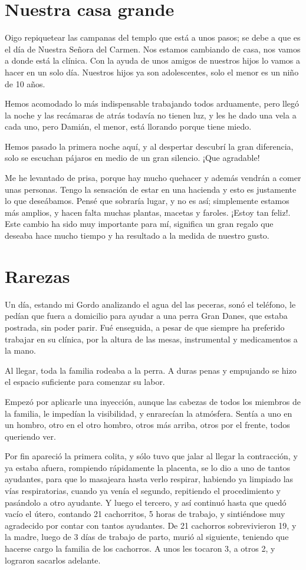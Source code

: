 \documentclass[letterpaper, 12pt]{book}
\begin{document}
\chapter{Nuestra casa grande}
Oigo repiquetear las campanas del templo que está a unos pasos; se debe a que es el día de Nuestra Señora del Carmen. Nos estamos cambiando de casa, nos vamos a donde está la clínica. Con la ayuda de unos amigos de nuestros hijos lo vamos a hacer en un solo día. Nuestros hijos ya son adolescentes, solo el menor es un niño de 10 años. 

Hemos acomodado lo más indispensable trabajando todos arduamente, pero llegó la noche y las recámaras de atrás todavía no tienen luz, y les he dado una vela a cada uno, pero Damián, el menor, está llorando porque tiene miedo.

Hemos pasado la primera noche aquí, y al despertar descubrí la gran diferencia, solo se escuchan pájaros en medio de un gran silencio. ¡Que agradable!

Me he levantado de prisa, porque hay mucho quehacer y además vendrán a comer unas personas. Tengo la sensación de estar en una hacienda y esto es justamente lo que deseábamos. Pensé que sobraría lugar, y no es así; simplemente estamos más amplios, y hacen falta muchas plantas, macetas y faroles. ¡Estoy tan feliz!. Este cambio ha sido muy importante para mí, significa un gran regalo que deseaba hace mucho tiempo y ha resultado a la medida de nuestro gusto.

\chapter{Rarezas}
Un día, estando mi Gordo analizando el agua del las peceras, sonó el teléfono, le pedían que fuera a domicilio para ayudar a una perra Gran Danes, que estaba postrada, sin poder parir. Fué enseguida, a pesar de que siempre ha preferido trabajar en su clínica, por la altura de las mesas, instrumental y medicamentos a la mano.

Al llegar, toda la familia rodeaba a la perra. A duras penas y empujando se hizo el espacio suficiente para comenzar su labor.

Empezó por aplicarle una inyección, aunque las cabezas de todos los miembros de la familia, le impedían la visibilidad, y enrarecían la atmósfera. Sentía a uno en un hombro, otro en el otro hombro, otros más arriba, otros por el frente, todos queriendo ver.

Por fin apareció la primera colita, y sólo tuvo que jalar al llegar la contracción, y ya estaba afuera, rompiendo rápidamente la placenta, se lo dio a uno de tantos ayudantes, para que lo masajeara hasta verlo respirar, habiendo ya limpiado las vías respiratorias, cuando ya venía el segundo, repitiendo el procedimiento y pasándolo a otro ayudante. Y luego el tercero, y así continuó hasta que quedó vacío el útero, contando 21 cachorritos, 5 horas de trabajo, y sintiéndose muy agradecido por contar con tantos ayudantes. De 21 cachorros sobrevivieron 19, y la madre, luego de 3 días de trabajo de parto, murió al siguiente, teniendo que hacerse cargo la familia de los cachorros. A unos les tocaron 3, a otros 2, y lograron sacarlos adelante.
\end{document}
